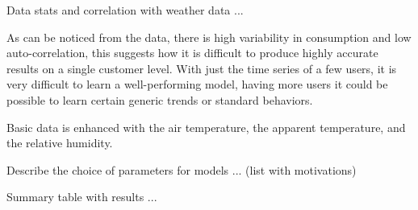 Data stats and correlation with weather data ...

As can be noticed from the data, there is high variability in consumption and low auto-correlation, this suggests how it is difficult to produce highly accurate results on a single customer level.
With just the time series of a few users, it is very difficult to learn a well-performing model, having more users it could be possible to learn certain generic trends or standard behaviors.

Basic data is enhanced with the air temperature, the apparent temperature, and the relative humidity.

Describe the choice of parameters for models ... (list with motivations)

Summary table with results ...
